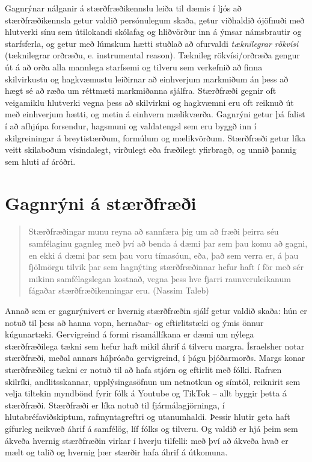 \documentclass[
  icelandic,
]{book}
\theoremstyle{definition}
\theoremstyle{definition}
\theoremstyle{definition}
\theoremstyle{definition}
\theoremstyle{remark}
\begin{document}
Gagnrýnar nálganir á stærðfræðikennslu leiða til dæmis í ljós að stærðfræðikennsla getur valdið persónulegum skaða, getur viðhaldið ójöfnuði með hlutverki sínu sem útilokandi skólafag og hliðvörður inn á ýmsar námsbrautir og starfsferla, og getur með lúmskum hætti stuðlað að ofurvaldi \emph{tæknilegrar rökvísi} (tæknilegrar orðræðu, e. instrumental reason). Tæknileg rökvísi/orðræða gengur út á að orða alla mannlega starfsemi og tilveru sem verkefnið að finna skilvirkustu og hagkvæmustu leiðirnar að einhverjum markmiðum án þess að hægt sé að ræða um réttmæti markmiðanna sjálfra. Stærðfræði gegnir oft veigamiklu hlutverki vegna þess að skilvirkni og hagkvæmni eru oft reiknuð út með einhverjum hætti, og metin á einhvern mælikværða. Gagnrýni getur þá falist í að afhjúpa forsendur, hagsmuni og valdatengsl sem eru byggð inn í skilgreiningar á breytistærðum, formúlum og mælikvörðum. Stærðfræði getur líka veitt skilaboðum vísindalegt, virðulegt eða fræðilegt yfirbragð, og unnið þannig sem hluti af áróðri.

\section{Gagnrýni á stærðfræði}\label{gagnryni_a_stae}

\begin{quote}
Stærðfræðingar munu reyna að sannfæra þig um að fræði þeirra séu samfélaginu gagnleg með því að benda á dæmi þar sem þau komu að gagni, en ekki á dæmi þar sem þau voru tímasóun, eða, það sem verra er, á þau fjölmörgu tilvik þar sem hagnýting stærðfræðinnar hefur haft í för með sér mikinn samfélagslegan kostnað, vegna þess hve fjarri raunveruleikanum fágaðar stærðfræðikenningar eru. (Nassim Taleb)
\end{quote}

Annað sem er gagnrýnivert er hvernig stærðfræðin sjálf getur valdið skaða: hún er notuð til þess að hanna vopn, hernaðar- og eftirlitstæki og ýmis önnur kúgunartæki. Gervigreind á formi risamállíkana er dæmi um nýlega stærðfræðilega tækni sem hefur haft mikil áhrif á tilveru margra. Ísraelsher notar stærðfræði, meðal annars háþróaða gervigreind, í þágu þjóðarmorðs. Margs konar stærðfræðileg tækni er notuð til að hafa stjórn og eftirlit með fólki. Rafræn skilríki, andlitsskannar, upplýsingasöfnun um netnotkun og símtöl, reiknirit sem velja tiltekin myndbönd fyrir fólk á Youtube og TikTok -- allt byggir þetta á stærðfræði. Stærðfræði er líka notuð til fjármálagjörninga, í hlutabréfaviðskiptum, rafmyntagreftri og utanumhaldi. Þessir hlutir geta haft gífurleg neikvæð áhrif á samfélög, líf fólks og tilveru. Og valdið er hjá þeim sem ákveða hvernig stærðfræðin virkar í hverju tilfelli: með því að ákveða hvað er mælt og talið og hvernig þær stærðir hafa áhrif á útkomuna.
\end{document}
